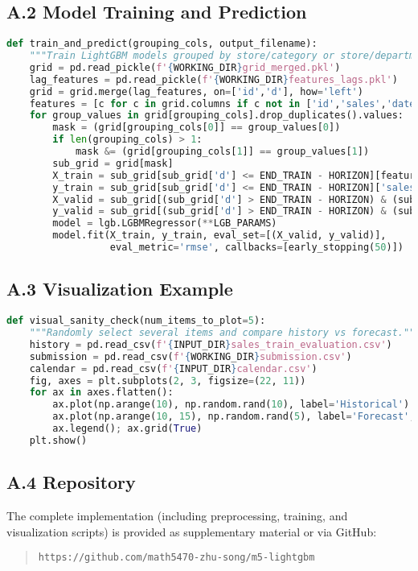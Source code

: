 \documentclass[12pt,a4paper]{article}
\begin{document}
\subsection*{A.2 Model Training and Prediction}
\begin{lstlisting}[language=Python]
def train_and_predict(grouping_cols, output_filename):
    """Train LightGBM models grouped by store/category or store/department."""
    grid = pd.read_pickle(f'{WORKING_DIR}grid_merged.pkl')
    lag_features = pd.read_pickle(f'{WORKING_DIR}features_lags.pkl')
    grid = grid.merge(lag_features, on=['id','d'], how='left')
    features = [c for c in grid.columns if c not in ['id','sales','date','d']]
    for group_values in grid[grouping_cols].drop_duplicates().values:
        mask = (grid[grouping_cols[0]] == group_values[0])
        if len(grouping_cols) > 1:
            mask &= (grid[grouping_cols[1]] == group_values[1])
        sub_grid = grid[mask]
        X_train = sub_grid[sub_grid['d'] <= END_TRAIN - HORIZON][features]
        y_train = sub_grid[sub_grid['d'] <= END_TRAIN - HORIZON]['sales']
        X_valid = sub_grid[(sub_grid['d'] > END_TRAIN - HORIZON) & (sub_grid['d'] <= END_TRAIN)][features]
        y_valid = sub_grid[(sub_grid['d'] > END_TRAIN - HORIZON) & (sub_grid['d'] <= END_TRAIN)]['sales']
        model = lgb.LGBMRegressor(**LGB_PARAMS)
        model.fit(X_train, y_train, eval_set=[(X_valid, y_valid)],
                  eval_metric='rmse', callbacks=[early_stopping(50)])
\end{lstlisting}

\subsection*{A.3 Visualization Example}
\begin{lstlisting}[language=Python]
def visual_sanity_check(num_items_to_plot=5):
    """Randomly select several items and compare history vs forecast."""
    history = pd.read_csv(f'{INPUT_DIR}sales_train_evaluation.csv')
    submission = pd.read_csv(f'{WORKING_DIR}submission.csv')
    calendar = pd.read_csv(f'{INPUT_DIR}calendar.csv')
    fig, axes = plt.subplots(2, 3, figsize=(22, 11))
    for ax in axes.flatten():
        ax.plot(np.arange(10), np.random.rand(10), label='Historical')
        ax.plot(np.arange(10, 15), np.random.rand(5), label='Forecast', linestyle='--')
        ax.legend(); ax.grid(True)
    plt.show()
\end{lstlisting}

\subsection*{A.4 Repository}
The complete implementation (including preprocessing, training, and visualization scripts)
is provided as supplementary material or via GitHub:
\begin{quote}
\texttt{https://github.com/math5470-zhu-song/m5-lightgbm}
\end{quote}
\end{document}
